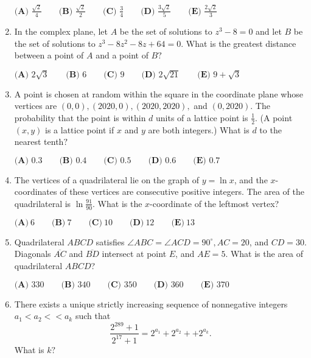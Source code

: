 \documentclass{article}
\begin{document}
\begin{enumerate}[label=\arabic*., itemsep=0.5em]
$\textbf{(A) } \frac{\sqrt{2}}{4} \qquad \textbf{(B) } \frac{\sqrt{2}}{2} \qquad \textbf{(C) } \frac{3}{4} \qquad \textbf{(D) } \frac{3\sqrt{2}}{5} \qquad \textbf{(E) } \frac{2\sqrt{2}}{3}$\par \vspace{0.5em}\item In the complex plane, let $A$ be the set of solutions to $z^3 - 8 = 0$ and let $B$ be the set of solutions to $z^3 - 8z^2 - 8z + 64 = 0$. What is the greatest distance between a point of $A$ and a point of $B?$

$\textbf{(A) } 2\sqrt{3} \qquad \textbf{(B) } 6 \qquad \textbf{(C) } 9 \qquad \textbf{(D) } 2\sqrt{21} \qquad \textbf{(E) } 9 + \sqrt{3}$\par \vspace{0.5em}\item A point is chosen at random within the square in the coordinate plane whose vertices are $(0, 0), (2020, 0), (2020, 2020),$ and $(0, 2020)$. The probability that the point is within $d$ units of a lattice point is $\tfrac{1}{2}$. (A point $(x, y)$ is a lattice point if $x$ and $y$ are both integers.) What is $d$ to the nearest tenth$?$

$\textbf{(A) } 0.3 \qquad \textbf{(B) } 0.4 \qquad \textbf{(C) } 0.5 \qquad \textbf{(D) } 0.6 \qquad \textbf{(E) } 0.7$\par \vspace{0.5em}\item The vertices of a quadrilateral lie on the graph of $y = \ln x$, and the $x$-coordinates of these vertices are consecutive positive integers. The area of the quadrilateral is $\ln \frac{91}{90}$. What is the $x$-coordinate of the leftmost vertex?

$\textbf{(A)}\ 6\qquad\textbf{(B)}\ 7\qquad\textbf{(C)}\ 10\qquad\textbf{(D)}\ 12\qquad\textbf{(E)}\ 13$\par \vspace{0.5em}\item Quadrilateral $ABCD$ satisfies $\angle ABC = \angle ACD = 90^{\circ}, AC = 20$, and $CD = 30$. Diagonals $\overline{AC}$ and $\overline{BD}$ intersect at point $E$, and $AE = 5$. What is the area of quadrilateral $ABCD$?

$\textbf{(A) } 330 \qquad\textbf{(B) } 340 \qquad\textbf{(C) } 350 \qquad\textbf{(D) } 360 \qquad\textbf{(E) } 370$\par \vspace{0.5em}\item There exists a unique strictly increasing sequence of nonnegative integers $a_1 < a_2 <  < a_k$ such that
\begin{equation*}
\frac{2^{289}+1}{2^{17}+1} = 2^{a_1} + 2^{a_2} +  + 2^{a_k}.
\end{equation*}
What is $k?$


\end{enumerate}
\end{document}
